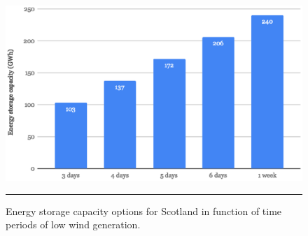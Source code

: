 \begin{figure}[htbp]
	\centering
	\includegraphics[width=.7\textwidth]{figures/storage_options.eps}
	\rule{\textwidth}{0.5pt} %
	\caption{Energy storage capacity options for Scotland in function of time periods of low wind generation.}
	\label{fig:storage_options}
\end{figure}